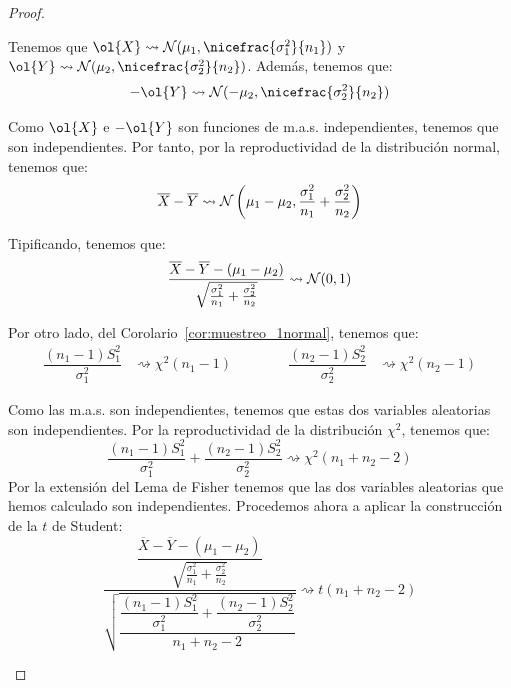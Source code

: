 \begin{coro}
\begin{proof}
\begin{enumerate}
            Tenemos que $\ol{X}\rightsquigarrow \cc{N}(\mu_1, \nicefrac{\sigma_1^2}{n_1})$ y $\ol{Y}\rightsquigarrow \cc{N}(\mu_2, \nicefrac{\sigma_2^2}{n_2})$. Además, tenemos que:
            \begin{equation*}
                -\ol{Y}\rightsquigarrow \cc{N}(-\mu_2, \nicefrac{\sigma_2^2}{n_2})
            \end{equation*}

            Como $\ol{X}$ e $-\ol{Y}$ son funciones de m.a.s. independientes, tenemos que son independientes. Por tanto, por la reproductividad de la distribución normal, tenemos que:
            \begin{equation*}
                \overline{X} - \overline{Y} \rightsquigarrow \mathcal{N}\left(\mu_1 - \mu_2, \frac{\sigma_1^2}{n_1} + \frac{\sigma_2^2}{n_2}\right)
            \end{equation*}

            Tipificando, tenemos que:
            \begin{equation*}
                \dfrac{\overline{X}-\overline{Y}-(\mu_1-\mu_2)}{\sqrt{\frac{\sigma_1^2}{n_1} + \frac{\sigma_2^2}{n_2}}} \rightsquigarrow \mathcal{N}(0,1)
            \end{equation*}


            Por otro lado, del Corolario~\ref{cor:muestreo_1normal}, tenemos que:
            \begin{align*}
                \dfrac{(n_1-1)S_1^2}{\sigma_1^2} &\rightsquigarrow \chi^2(n_1-1) \qquad \qquad
                \dfrac{(n_2-1)S_2^2}{\sigma_2^2} &\rightsquigarrow \chi^2(n_2-1) 
            \end{align*}

            Como las m.a.s. son independientes, tenemos que estas dos variables aleatorias son independientes. Por la reproductividad de la distribución $\chi^2$, tenemos que:
            \begin{equation*}
                \dfrac{(n_1-1)S_1^2}{\sigma_1^2}  + \dfrac{(n_2-1)S_2^2}{\sigma_2^2}  \rightsquigarrow \chi^2(n_1+n_2-2)
            \end{equation*}
            Por la extensión del Lema de Fisher tenemos que las dos variables aleatorias que hemos calculado son independientes. Procedemos ahora a aplicar la construcción de la $t$ de Student:
            \begin{equation*}
                \dfrac{\dfrac{\overline{X}-\overline{Y}-(\mu_1-\mu_2)}{\sqrt{\frac{\sigma_1^2}{n_1}+\frac{\sigma_2^2}{n_2}}}}{\sqrt{\dfrac{\dfrac{(n_1-1)S_1^2}{\sigma_1^2} + \dfrac{(n_2-1)S_2^2}{\sigma_2^2}}{n_1+n_2-2}}} \rightsquigarrow t(n_1+n_2-2)
            \end{equation*}
    \end{enumerate}
    \end{proof}
\end{coro}

